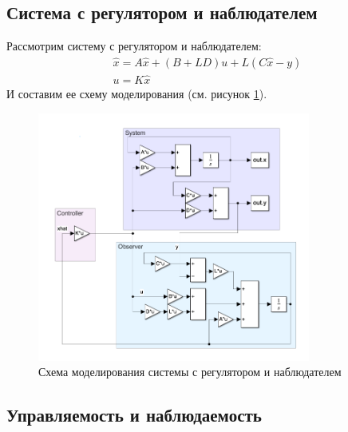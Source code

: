 \subsection{Система с регулятором и наблюдателем}
Рассмотрим систему с регулятором и наблюдателем:
\begin{equation}
    \begin{array}{ll}
        \hat{x} = A\hat{x} + (B + LD)u + L(C\hat{x} - y)\\
        u = K\hat{x}
    \end{array}
\end{equation}
И составим ее схему моделирования (см. рисунок \ref{fig:scheme3}).
\begin{figure}[ht!]
    \centering
    \includegraphics[width=0.8\textwidth]{media/scheme3.png}
    \caption{Схема моделирования системы с регулятором и наблюдателем}
    \label{fig:scheme3}
\end{figure}

\subsection{Управляемость и наблюдаемость}

